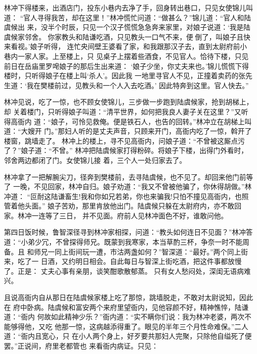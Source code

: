 林冲下得楼来，出酒店门，投东小巷内去净了手，回身转出巷口，只见女使锦儿叫道：
“官人寻得我苦，却在这里！”林冲慌忙问道：“做甚么？”锦儿道：“官人和陆虞候出
来，没半个时辰，只见一个汉子慌慌急急奔来家里，对娘子说道：‘我是陆虞候家邻舍。
你家教头和陆谦吃酒，只见教头一口气不来，便倒了，叫娘子且快来看视。’娘子听得，
连忙央间壁王婆看了家，和我跟那汉子去，直到太尉府前小巷内一家人家。上至楼上，只
见桌子上摆着些酒食，不见官人。恰待下楼，只见前日在岳庙里罗唣娘子的那后生出来道：
‘娘子少坐，你丈夫来也。’锦儿慌慌下得楼时，只听得娘子在楼上叫‘杀人’。因此我
一地里寻官人不见，正撞着卖药的张先生道：‘我在樊楼前过，见教头和一个人入去吃酒。’
因此特奔到这里。官人快去。”

林冲见说，吃了一惊，也不顾女使锦儿，三步做一步跑到陆虞候家，抢到胡梯上，却
关着楼门，只听得娘子叫道：“清平世界，如何把我良人妻子关在这里？”又听得高衙内
道：“娘子，可怜见救俺。便是铁石人，也告的回转。”林冲立在胡梯上叫道：“大嫂开
门。”那妇人听的是丈夫声音，只顾来开门，高衙内吃了一惊，斡开了楼窗，跳墙走了。
林冲上的楼上，寻不见高衙内，问娘子道：“不曾被这厮点污了？”娘子道：“不曾。”
林冲把陆虞候家打得粉碎。将娘子下楼，出得门外看时，邻舍两边都闭了门。女使锦儿接
着，三个人一处归家去了。

林冲拿了一把解腕尖刀，径奔到樊楼前，去寻陆虞候，也不见了。却回来他门前等了
一晚，不见回家，林冲自归。娘子劝道：“我又不曾被他骗了，你休得胡做。”林冲道：
“叵耐这陆谦畜生!我和你如兄若弟，你也来骗我!只怕不撞见高衙内，也照管着他头面。”
娘子苦劝，那里肯放他出门。陆虞候只躲在太尉府内，亦不敢回家。林冲一连等了三日，
并不见面。府前人见林冲面色不好，谁敢问他。

第四日饭时候，鲁智深径寻到林冲家相探，问道：“教头如何连日不见面？”林冲答
道：“小弟少冗，不曾探得师兄。既蒙到我寒家，本当草酌三杯，争奈一时不能周备。且
和师兄一同上街间玩一遭，市沽两盏如何？”智深道：“最好。”两个同上街来，吃了一
日酒，又约明日相会。自此每日与智深上街吃酒，把这件事都放慢了。正是：
丈夫心事有亲朋，谈笑酣歌散郁蒸。
只有女人愁闷处，深闺无语病难兴。

且说高衙内自从那日在陆虞候家楼上吃了那惊，跳墙脱走，不敢对太尉说知，因此在
府中卧病。陆虞候和富安两个来府里望衙内，见他容颜不好，精神憔悴，陆谦道：“衙内
何故如此精神少乐？”衙内道：“实不瞒你们说：我为林冲老婆，两次不能够得他，又吃
他那一惊，这病越添得重了。眼见的半年三个月性命难保。”二人道：“衙内且宽心，只
在小人两个身上，好歹要共那妇人完聚，只除他自缢死了便罢。”正说间，府里老都管也
来看衙内病证。只见：

